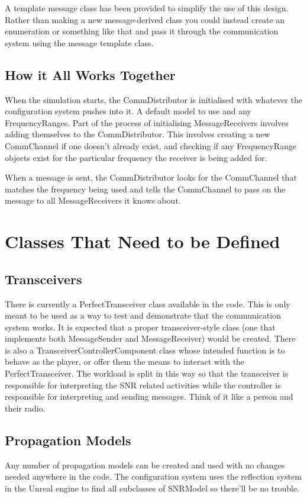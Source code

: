 \documentclass[../main.tex]{subfiles}
\begin{document}
A template message class has been provided to simplify the use of this design.
Rather than making a new message-derived class you could instead create an enumeration or something like that and pass it through the communication system using the message template class.

\subsection{How it All Works Together}
When the simulation starts, the CommDistributor is initialised with whatever the configuration system pushes into it.
A default model to use and any FrequencyRanges.
Part of the process of initialising MessageReceivers involves adding themselves to the CommDistributor.
This involves creating a new CommChannel if one doesn't already exist, and checking if any FrequencyRange objects exist for the particular frequency the receiver is being added for.

When a message is sent, the CommDistributor looks for the CommChannel that matches the frequency being used and tells the CommChannel to pass on the message to all MessageReceivers it knows about.

\section{Classes That Need to be Defined}
\subsection{Transceivers}
There is currently a PerfectTransceiver class available in the code.
This is only meant to be used as a way to test and demonstrate that the communication system works.
It is expected that a proper transceiver-style class (one that implements both MessageSender and MessageReceiver) would be created.
There is also a TransceiverControllerComponent class whose intended function is to behave as the player, or offer them the means to interact with the PerfectTransceiver.
The workload is split in this way so that the transceiver is responsible for interpreting the SNR related activities while the controller is responsible for interpreting and sending messages.
Think of it like a person and their radio.

\subsection{Propagation Models}
Any number of propagation models can be created and used with no changes needed anywhere in the code.
The configuration system uses the reflection system in the Unreal engine to find all subclasses of SNRModel so there'll be no trouble.
\end{document}
